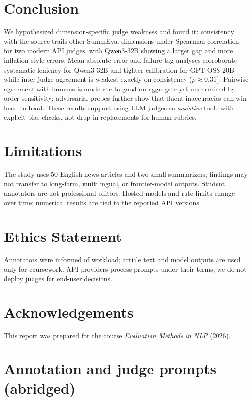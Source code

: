 \documentclass[11pt]{article}
\begin{document}
\section{Conclusion}

We hypothesized dimension-specific judge weakness and found it: consistency with the source trails other SummEval dimensions under Spearman correlation for two modern API judges, with Qwen3-32B showing a larger gap and more inflation-style errors. Mean-absolute-error and failure-tag analyses corroborate systematic leniency for Qwen3-32B and tighter calibration for GPT-OSS-20B, while inter-judge agreement is weakest exactly on consistency ($\rho{\approx}0.31$). Pairwise agreement with humans is moderate-to-good on aggregate yet undermined by order sensitivity; adversarial probes further show that fluent inaccuracies can win head-to-head. These results support using LLM judges as \emph{assistive} tools with explicit bias checks, not drop-in replacements for human rubrics.

\section*{Limitations}

The study uses 50 English news articles and two small summarizers; findings may not transfer to long-form, multilingual, or frontier-model outputs. Student annotators are not professional editors. Hosted models and rate limits change over time; numerical results are tied to the reported API versions.

\section*{Ethics Statement}

Annotators were informed of workload; article text and model outputs are used only for coursework. API providers process prompts under their terms; we do not deploy judges for end-user decisions.

\section*{Acknowledgements}

This report was prepared for the course \textit{Evaluation Methods in NLP} (2026).




\appendix

\section{Annotation and judge prompts (abridged)}
\end{document}
